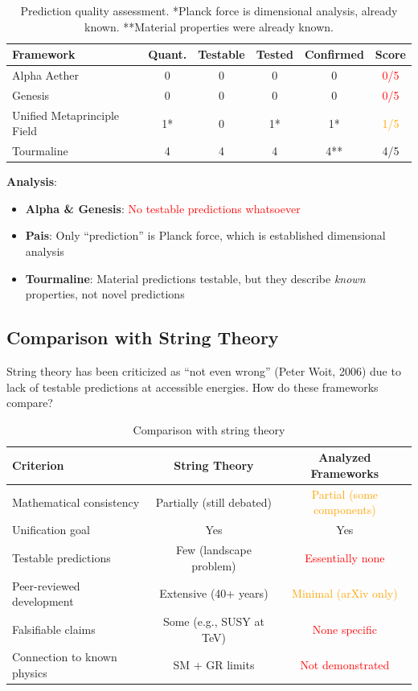 \begin{table}[H]
\centering
\begin{tabular}{lccccc}
\toprule
\textbf{Framework} & \textbf{Quant.} & \textbf{Testable} & \textbf{Tested} & \textbf{Confirmed} & \textbf{Score} \\
\midrule
Alpha Aether & 0 & 0 & 0 & 0 & \textcolor{red}{0/5} \\
Genesis & 0 & 0 & 0 & 0 & \textcolor{red}{0/5} \\
Unified Metaprinciple Field & 1* & 0 & 1* & 1* & \textcolor{orange}{1/5} \\
Tourmaline & 4 & 4 & 4 & 4** & \textcolor{validcolor}{4/5} \\
\bottomrule
\end{tabular}
\caption{Prediction quality assessment. *Planck force is dimensional analysis, already known. **Material properties were already known.}
\end{table}

\textbf{Analysis}:
\begin{itemize}
    \item \textbf{Alpha \& Genesis}: \textcolor{red}{No testable predictions whatsoever}
    \item \textbf{Pais}: Only ``prediction'' is Planck force, which is established dimensional analysis
    \item \textbf{Tourmaline}: Material predictions testable, but they describe \textit{known} properties, not novel predictions
\end{itemize}

\subsection{Comparison with String Theory}

String theory has been criticized as ``not even wrong'' (Peter Woit, 2006) due to lack of testable predictions at accessible energies. How do these frameworks compare?

\begin{table}[H]
\centering
\small
\begin{tabular}{lcc}
\toprule
\textbf{Criterion} & \textbf{String Theory} & \textbf{Analyzed Frameworks} \\
\midrule
Mathematical consistency & Partially (still debated) & \textcolor{orange}{Partial (some components)} \\
Unification goal & Yes & Yes \\
Testable predictions & Few (landscape problem) & \textcolor{red}{Essentially none} \\
Peer-reviewed development & Extensive (40+ years) & \textcolor{orange}{Minimal (arXiv only)} \\
Falsifiable claims & Some (e.g., SUSY at TeV) & \textcolor{red}{None specific} \\
Connection to known physics & SM + GR limits & \textcolor{red}{Not demonstrated} \\
\bottomrule
\end{tabular}
\caption{Comparison with string theory}
\end{table}

